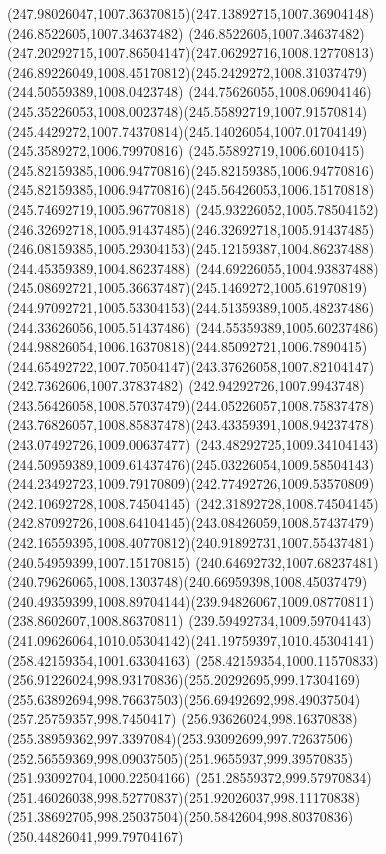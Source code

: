 {{		\curveto(247.98026047,1007.36370815)(247.13892715,1007.36904148)(246.8522605,1007.34637482)
		\curveto(246.8522605,1007.34637482)(247.20292715,1007.86504147)(247.06292716,1008.12770813)
		\curveto(246.89226049,1008.45170812)(245.2429272,1008.31037479)(244.50559389,1008.0423748)
		\curveto(244.75626055,1008.06904146)(245.35226053,1008.0023748)(245.55892719,1007.91570814)
		\curveto(245.4429272,1007.74370814)(245.14026054,1007.01704149)(245.3589272,1006.79970816)
		\curveto(245.55892719,1006.6010415)(245.82159385,1006.94770816)(245.82159385,1006.94770816)
		\curveto(245.82159385,1006.94770816)(245.56426053,1006.15170818)(245.74692719,1005.96770818)
		\curveto(245.93226052,1005.78504152)(246.32692718,1005.91437485)(246.32692718,1005.91437485)
		\curveto(246.08159385,1005.29304153)(245.12159387,1004.86237488)(244.45359389,1004.86237488)
		\curveto(244.69226055,1004.93837488)(245.08692721,1005.36637487)(245.1469272,1005.61970819)
		\curveto(244.97092721,1005.53304153)(244.51359389,1005.48237486)(244.33626056,1005.51437486)
		\curveto(244.55359389,1005.60237486)(244.98826054,1006.16370818)(244.85092721,1006.7890415)
		\curveto(244.65492722,1007.70504147)(243.37626058,1007.82104147)(242.7362606,1007.37837482)
		\curveto(242.94292726,1007.9943748)(243.56426058,1008.57037479)(244.05226057,1008.75837478)
		\curveto(243.76826057,1008.85837478)(243.43359391,1008.94237478)(243.07492726,1009.00637477)
		\curveto(243.48292725,1009.34104143)(244.50959389,1009.61437476)(245.03226054,1009.58504143)
		\curveto(244.23492723,1009.79170809)(242.77492726,1009.53570809)(242.10692728,1008.74504145)
		\curveto(242.31892728,1008.74504145)(242.87092726,1008.64104145)(243.08426059,1008.57437479)
		\curveto(242.16559395,1008.40770812)(240.91892731,1007.55437481)(240.54959399,1007.15170815)
		\curveto(240.64692732,1007.68237481)(240.79626065,1008.1303748)(240.66959398,1008.45037479)
		\curveto(240.49359399,1008.89704144)(239.94826067,1009.08770811)(238.8602607,1008.86370811)
		\curveto(239.59492734,1009.59704143)(241.09626064,1010.05304142)(241.19759397,1010.45304141)
		\moveto(258.42159354,1001.63304163)
		\curveto(258.42159354,1000.11570833)(256.91226024,998.93170836)(255.20292695,999.17304169)
		\curveto(255.63892694,998.76637503)(256.69492692,998.49037504)(257.25759357,998.7450417)
		\curveto(256.93626024,998.16370838)(255.38959362,997.3397084)(253.93092699,997.72637506)
		\curveto(252.56559369,998.09037505)(251.9655937,999.39570835)(251.93092704,1000.22504166)
		\curveto(251.28559372,999.57970834)(251.46026038,998.52770837)(251.92026037,998.11170838)
		\curveto(251.38692705,998.25037504)(250.5842604,998.80370836)(250.44826041,999.79704167)
}}
